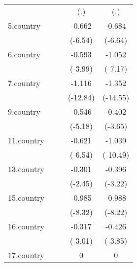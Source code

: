 {\begin{tabular}{l*{4}{c}}
            &                     &                     &         (.)         &         (.)         \\
[1em]
5.country   &                     &                     &      -0.662\sym{***}&      -0.684\sym{***}\\
            &                     &                     &     (-6.54)         &     (-6.64)         \\
[1em]
6.country   &                     &                     &      -0.593\sym{***}&      -1.052\sym{***}\\
            &                     &                     &     (-3.99)         &     (-7.17)         \\
[1em]
7.country   &                     &                     &      -1.116\sym{***}&      -1.352\sym{***}\\
            &                     &                     &    (-12.84)         &    (-14.55)         \\
[1em]
9.country   &                     &                     &      -0.546\sym{***}&      -0.402\sym{***}\\
            &                     &                     &     (-5.18)         &     (-3.65)         \\
[1em]
11.country  &                     &                     &      -0.621\sym{***}&      -1.039\sym{***}\\
            &                     &                     &     (-6.54)         &    (-10.49)         \\
[1em]
13.country  &                     &                     &      -0.301\sym{*}  &      -0.396\sym{**} \\
            &                     &                     &     (-2.45)         &     (-3.22)         \\
[1em]
15.country  &                     &                     &      -0.985\sym{***}&      -0.988\sym{***}\\
            &                     &                     &     (-8.32)         &     (-8.22)         \\
[1em]
16.country  &                     &                     &      -0.317\sym{**} &      -0.426\sym{***}\\
            &                     &                     &     (-3.01)         &     (-3.85)         \\
[1em]
17.country  &                     &                     &           0         &           0         \\

\end{tabular}}
